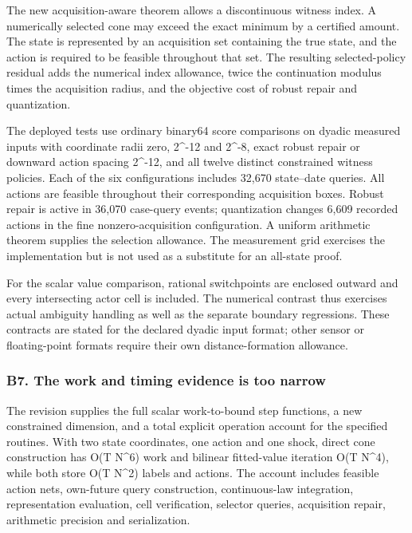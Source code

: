 \documentclass[ecta,nameyear,draft]{econsocart}
\begin{document}
The new acquisition-aware theorem allows a discontinuous witness index.
A numerically selected cone may exceed the exact minimum by a certified
amount. The state is represented by an acquisition set containing the
true state, and the action is required to be feasible throughout that
set. The resulting selected-policy residual adds the numerical index
allowance, twice the continuation modulus times the acquisition radius,
and the objective cost of robust repair and quantization.

The deployed tests use ordinary binary64 score comparisons on dyadic
measured inputs with coordinate radii zero, 2\^{}-12 and 2\^{}-8, exact
robust repair or downward action spacing 2\^{}-12, and all twelve
distinct constrained witness policies. Each of the six configurations
includes 32,670 state--date queries. All actions are feasible throughout
their corresponding acquisition boxes. Robust repair is active in 36,070
case-query events; quantization changes 6,609 recorded actions in the
fine nonzero-acquisition configuration. A uniform arithmetic theorem
supplies the selection allowance. The measurement grid exercises the
implementation but is not used as a substitute for an all-state proof.

For the scalar value comparison, rational switchpoints are enclosed
outward and every intersecting actor cell is included. The numerical
contrast thus exercises actual ambiguity handling as well as the
separate boundary regressions. These contracts are stated for the
declared dyadic input format; other sensor or floating-point formats
require their own distance-formation allowance.

\hypertarget{b7-the-work-and-timing-evidence-is-too-narrow}{%
\subsubsection{B7. The work and timing evidence is too
narrow}\label{b7-the-work-and-timing-evidence-is-too-narrow}}

The revision supplies the full scalar work-to-bound step functions, a
new constrained dimension, and a total explicit operation account for
the specified routines. With two state coordinates, one action and one
shock, direct cone construction has O(T N\^{}6) work and bilinear
fitted-value iteration O(T N\^{}4), while both store O(T N\^{}2) labels
and actions. The account includes feasible action nets, own-future query
construction, continuous-law integration, representation evaluation,
cell verification, selector queries, acquisition repair, arithmetic
precision and serialization.
\end{document}
